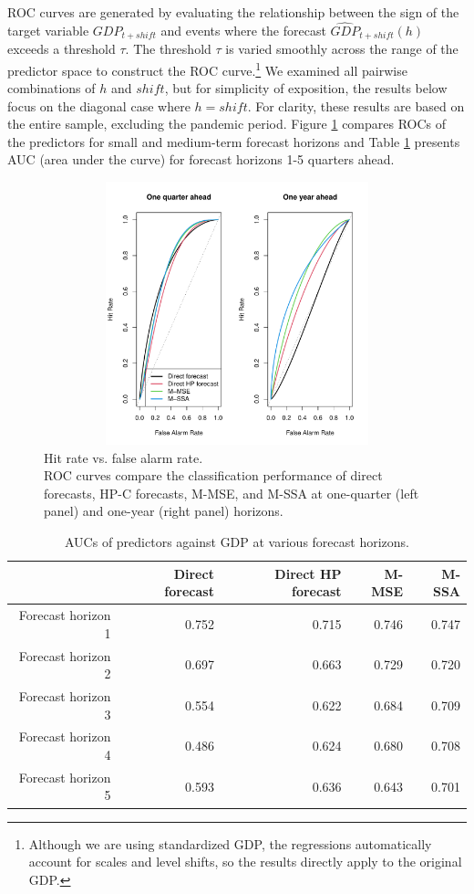 \documentclass[11pt,a4paper]{article}
\begin{document}
ROC curves are generated by evaluating the relationship between the sign of the target variable $GDP_{t+shift}$ and events where the forecast $\widehat{GDP}_{t+shift}(h)$ exceeds a threshold $\tau$. The threshold $\tau$ is varied smoothly across the range of the predictor space to construct the ROC curve.\footnote{Although we are using standardized GDP, the regressions automatically account for scales and level shifts, so the results directly apply to the original GDP.} We examined all pairwise combinations of $h$ and $shift$, but for simplicity of exposition, the results below focus on the diagonal case where $h=shift$. 
For clarity, these results are based on the entire sample, excluding the pandemic period. Figure \ref{fig:ROC_GDP_shift_1_4} compares ROCs of the predictors for small and medium-term forecast horizons and Table \ref{tab:auc} presents AUC (area under the curve) for forecast horizons 1-5 quarters ahead.

\begin{figure}[h]
\begin{center}
\includegraphics[height=3in, width=5in]{./Figures/ROC_GDP_shift_1_4.pdf}
\caption{Hit rate vs. false alarm rate.\\ 
ROC curves compare the classification performance of direct forecasts, HP-C forecasts, M-MSE, and M-SSA at one-quarter (left panel) and one-year (right panel) horizons.
\label{fig:ROC_GDP_shift_1_4}}
\end{center}
\end{figure}


\begin{table}[ht]
\caption{AUCs of predictors against GDP at various forecast horizons.} 
\label{tab:auc}
\centering
\begin{tabular}{rrrrr}
  \hline
 & Direct forecast & Direct HP forecast & M-MSE & M-SSA \\ 
  \hline
Forecast horizon 1 & 0.752 & 0.715 & 0.746 & 0.747 \\ 
  Forecast horizon 2 & 0.697 & 0.663 & 0.729 & 0.720 \\ 
  Forecast horizon 3 & 0.554 & 0.622 & 0.684 & 0.709 \\ 
  Forecast horizon 4 & 0.486 & 0.624 & 0.680 & 0.708 \\ 
  Forecast horizon 5 & 0.593 & 0.636 & 0.643 & 0.701 \\ 
   \hline
\end{tabular}

\end{table}
\end{document}
